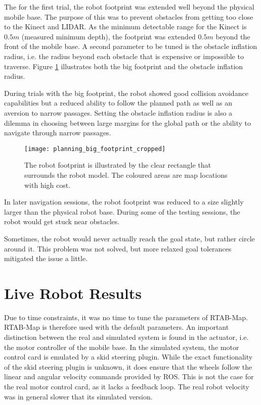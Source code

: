 The for the first trial, the robot footprint was extended well beyond the physical mobile base. The purpose of this was to prevent obstacles from getting too close to the Kinect and \ac{LIDAR}. As the minimum detectable range for the Kinect is $0.5 m$ (measured minimum depth), the footprint was extended $0.5 m$ beyond the front of the mobile base. A second parameter to be tuned is the obstacle inflation radius, i.e. the radius beyond each obstacle that is expensive or impossible to traverse. Figure \ref{fig:big_footprint} illustrates both the big footprint and the obstacle inflation radius.

During trials with the big footprint, the robot showed good collision avoidance capabilities but a reduced ability to follow the planned path as well as an aversion to narrow passages. Setting the obstacle inflation radius is also a dilemma in choosing between large margins for the global path or the ability to navigate through narrow passages. 

\begin{figure}[h]
	\centering
	\texttt{[image: planning\_big\_footprint\_cropped]}
	\caption{The robot footprint is illustrated by the clear rectangle that surrounds the robot model. The coloured areas are map locations with high cost. }
	\label{fig:big_footprint}
\end{figure}

In later navigation sessions, the robot footprint was reduced to a size slightly larger than the physical robot base. During some of the testing sessions, the robot would get stuck near obstacles. 

Sometimes, the robot would never actually reach the goal state, but rather circle around it. This problem was not solved, but more relaxed goal tolerances mitigated the issue a little. 

\section{Live Robot Results}

Due to time constraints, it was no time to tune the parameters of \ac{RTAB-Map}. \ac{RTAB-Map} is therefore used with the default parameters. An important distinction between the real and simulated system is found in the actuator, i.e. the motor controller of the mobile base. In the simulated system, the motor control card is emulated by a skid steering plugin. While the exact functionality of the skid steering plugin is unknown, it does ensure that the wheels follow the linear and angular velocity commands provided by \ac{ROS}. This is not the case for the real motor control card, as it lacks a feedback loop. The real robot velocity was in general slower that its simulated version.

